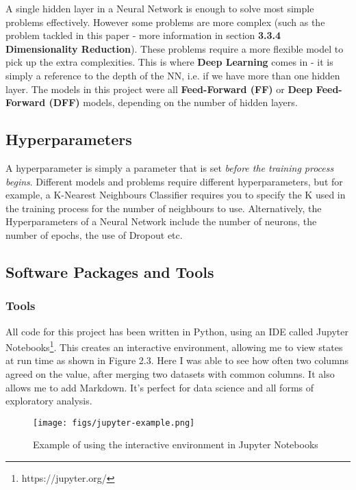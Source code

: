 \documentclass[12pt,a4paper,twoside,openright]{report}
\begin{document}
A single hidden layer in a Neural Network is enough to solve most simple problems effectively. However some problems are more complex (such as the problem tackled in this paper - more information in section \textbf{3.3.4 Dimensionality Reduction}). These problems require a more flexible model to pick up the extra complexities. This is where \textbf{Deep Learning} comes in - it is simply a reference to the depth of the NN, i.e. if we have more than one hidden layer. The models in this project were all \textbf{Feed-Forward (FF)} or \textbf{Deep Feed-Forward (DFF)} models, depending on the number of hidden layers.

\subsection{Hyperparameters}

A hyperparameter is simply a parameter that is set \textit{before the training process begins}. Different models and problems require different hyperparameters, but for example, a K-Nearest Neighbours Classifier requires you to specify the K used in the training process for the number of neighbours to use. Alternatively, the Hyperparameters of a Neural Network include the number of neurons, the number of epochs, the use of Dropout etc.

\subsection{Software Packages and Tools}

\subsubsection{Tools}

All code for this project has been written in Python, using an IDE called Jupyter Notebooks\footnote{https://jupyter.org/}. This creates an interactive environment, allowing me to view states at run time as shown in Figure 2.3. Here I was able to see how often two columns agreed on the value, after merging two datasets with common columns. It also allows me to add Markdown. It's perfect for data science and all forms of exploratory analysis.

\begin{figure}[h]
  \texttt{[image: figs/jupyter-example.png]}
  \caption{Example of using the interactive environment in Jupyter Notebooks}
  \label{fig:jupyter-example}
\end{figure}
\end{document}
